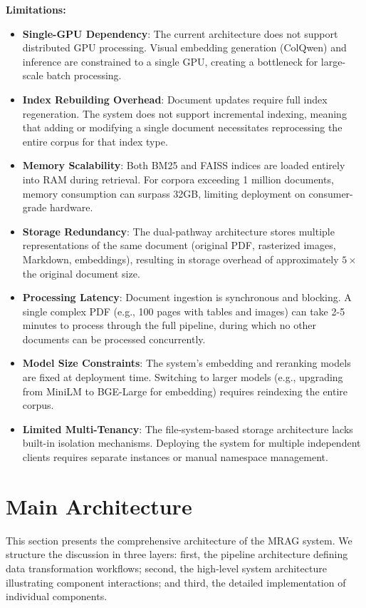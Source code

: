 \textbf{Limitations:}
\begin{itemize}
    \item \textbf{Single-GPU Dependency}: The current architecture does not support distributed GPU processing. Visual embedding generation (ColQwen) and inference are constrained to a single GPU, creating a bottleneck for large-scale batch processing.
    \item \textbf{Index Rebuilding Overhead}: Document updates require full index regeneration. The system does not support incremental indexing, meaning that adding or modifying a single document necessitates reprocessing the entire corpus for that index type.
    \item \textbf{Memory Scalability}: Both BM25 and FAISS indices are loaded entirely into RAM during retrieval. For corpora exceeding 1 million documents, memory consumption can surpass 32GB, limiting deployment on consumer-grade hardware.
    \item \textbf{Storage Redundancy}: The dual-pathway architecture stores multiple representations of the same document (original PDF, rasterized images, Markdown, embeddings), resulting in storage overhead of approximately $5\times$ the original document size.
    \item \textbf{Processing Latency}: Document ingestion is synchronous and blocking. A single complex PDF (e.g., 100 pages with tables and images) can take 2-5 minutes to process through the full pipeline, during which no other documents can be processed concurrently.
    \item \textbf{Model Size Constraints}: The system's embedding and reranking models are fixed at deployment time. Switching to larger models (e.g., upgrading from MiniLM to BGE-Large for embedding) requires reindexing the entire corpus.
    \item \textbf{Limited Multi-Tenancy}: The file-system-based storage architecture lacks built-in isolation mechanisms. Deploying the system for multiple independent clients requires separate instances or manual namespace management.
\end{itemize}

\section{Main Architecture}

This section presents the comprehensive architecture of the MRAG system. We structure the discussion in three layers: first, the pipeline architecture defining data transformation workflows; second, the high-level system architecture illustrating component interactions; and third, the detailed implementation of individual components.

